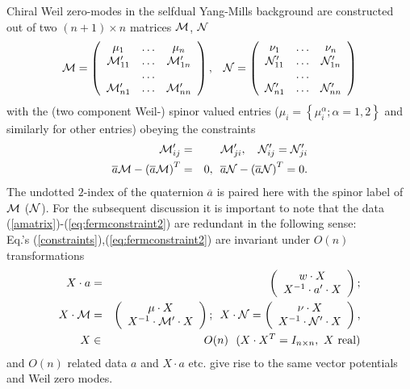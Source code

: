 \documentclass[a4paper,12pt]{article}
\begin{document}
Chiral Weil zero-modes in the selfdual Yang-Mills background are 
constructed out of two $(n+1)\times n$ matrices ${\cal M}$, 
${\cal N}$
\begin{eqnarray}
{\cal M}=\left( \begin{array}{ccc}
\mu_1 & \ldots & \mu_n \\
{\cal M}'_{11} & \ldots & {\cal M}'_{1n} \\
 & \ldots &  \\
{\cal M}'_{n1} & \ldots & {\cal M}'_{nn}
\end{array}\right), \, \, \, \, \, 
{\cal N}=\left( \begin{array}{ccc}
\nu_1 & \ldots & \nu_n \\
{\cal N}'_{11} & \ldots & {\cal N}'_{1n} \\
 & \ldots &  \\
{\cal N}'_{n1} & \ldots & {\cal N}'_{nn}
\end{array}\right)
\label{mnmatrix}
\end{eqnarray}
with the (two component Weil-) spinor valued entries ($\mu_i= 
\left\{\mu_i^{\alpha}; \alpha=1,2\right\}$  and similarly for 
other entries) obeying the constraints
\begin{eqnarray}
\label{eq:fermconstraint1}
{\cal M}'_{ij}&=& {\cal M}'_{ji}, \, \, \, \, \, \,  
{\cal N}'_{ij} = {\cal N}'_{ji} \\
\overline{a}{\cal M}-\left(\overline{a}{\cal M}\right)^T&=&0, \, \, \, 
\overline{a}{\cal N}-\left(\overline{a}{\cal N}\right)^T=0.
\label{eq:fermconstraint2}
\end{eqnarray}
The undotted $2$-index of the quaternion $\overline{a}$ is 
paired here with the spinor label of ${\cal M}$ (${\cal N}$). 
For the subsequent discussion it is important to note that the 
data (\ref{amatrix})-(\ref{eq:fermconstraint2}) are redundant in 
the following sense: \\
Eq.'s (\ref{constraints}),(\ref{eq:fermconstraint2}) are invariant 
under $O(n)$ transformations 
\begin{eqnarray}
X \cdot a &=& \left(
\begin{array}{c} 
w \cdot X \\
X^{-1} \cdot a' \cdot X 
\end{array}
\right); \\
X \cdot {\cal M} &=& \left(
\begin{array}{c} 
\mu \cdot X \\
X^{-1} \cdot {\cal M}' \cdot X 
\end{array}
\right); \, \, \, 
X \cdot {\cal N} = \left(
\begin{array}{c} 
\nu \cdot X \\
X^{-1} \cdot {\cal N}' \cdot X 
\end{array}
\right), \\
X &\in& O(n) \,\,\,\, (X \cdot X^T=I_{n\times n}, \,\, X \,\, 
\mbox{real}) \nonumber
\end{eqnarray}
and $O(n)$ related data $a$ and $X \cdot a$ etc. give rise to 
the same vector potentials and Weil zero modes. 
\end{document}
